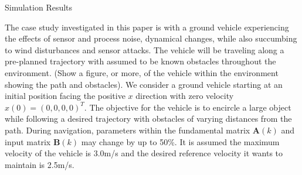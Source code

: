 
\begin{section}{Simulation Results}
\label{sec:simulation}


The case study investigated in this paper is with a ground vehicle experiencing the effects of sensor and process noise, dynamical changes, while also succumbing to wind disturbances and sensor attacks. The vehicle will be traveling along a pre-planned trajectory with assumed to be known obstacles throughout the environment. (Show a figure, or more, of the vehicle within the environment showing the path and obstacles). We consider a ground vehicle starting at an initial position facing the positive $x$ direction with zero velocity $x(0)=(0,0,0,0)^T$. The objective for the vehicle is to encircle a large object while following a desired trajectory with obstacles of varying distances from the path. During navigation, parameters within the fundamental matrix $\bm{A}(k)$ and input matrix $\bm{B}(k)$ may change by up to 50\%. It is assumed the maximum velocity of the vehicle is 3.0m/s and the desired reference velocity it wants to maintain is 2.5m/s. 









\end{section}

